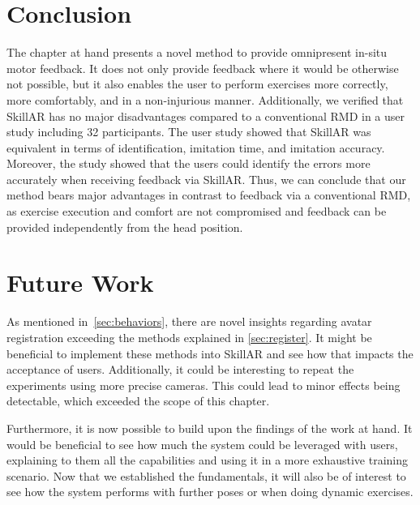 \section{Conclusion}
The chapter at hand presents a novel method to provide omnipresent in-situ motor feedback. It does not only provide feedback where it would be otherwise not possible, but it also enables the user to perform exercises more correctly, more comfortably, and in a non-injurious manner. Additionally, we verified that SkillAR has no major disadvantages compared to a conventional RMD in a user study including 32 participants. The user study showed that SkillAR was equivalent in terms of identification, imitation time, and imitation accuracy. Moreover, the study showed that the users could identify the errors more accurately when receiving feedback via SkillAR. Thus, we can conclude that our method bears major advantages in contrast to feedback via a conventional RMD, as exercise execution and comfort are not compromised and feedback can be provided independently from the head position.

\section{Future Work}
As mentioned in~\autoref{sec:behaviors}, there are novel insights regarding avatar registration exceeding the methods explained in \autoref{sec:register}. It might be beneficial to implement these methods into SkillAR and see how that impacts the acceptance of users. Additionally, it could be interesting to repeat the experiments using more precise cameras. This could lead to minor effects being detectable, which exceeded the scope of this chapter.

Furthermore, it is now possible to build upon the findings of the work at hand. It would be beneficial to see how much the system could be leveraged with users, explaining to them all the capabilities and using it in a more exhaustive training scenario. Now that we established the fundamentals, it will also be of interest to see how the system performs with further poses or when doing dynamic exercises.
